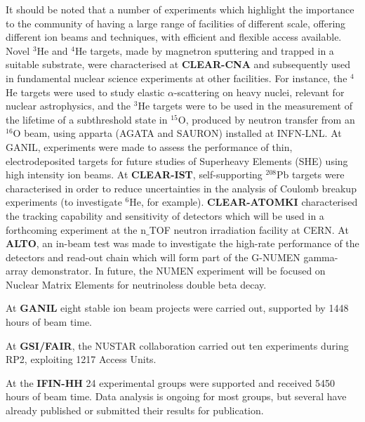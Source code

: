 It should be noted that a number of experiments which highlight the importance to the community of having a large range of facilities of different scale, offering different ion beams and techniques, with efficient and flexible access available. Novel $^3$He and $^4$He targets, made by magnetron sputtering and trapped in a suitable substrate, were characterised at \textbf{CLEAR-CNA} and subsequently used in fundamental nuclear science experiments at other facilities. For instance, the $^4$He targets were used to study elastic $\alpha$-scattering on heavy nuclei, relevant for nuclear astrophysics, and the $^3$He targets were to be used in the measurement of the lifetime of a subthreshold state in $^{15}$O, produced by neutron transfer from an $^{16}$O beam, using apparta (AGATA and SAURON) installed at INFN-LNL. 
At GANIL, experiments were made to assess the performance of thin, electrodeposited targets for future studies of Superheavy Elements (SHE) using high intensity ion beams. At \textbf{CLEAR-IST}, self-supporting $^{208}$Pb targets were characterised in order to reduce uncertainties in the analysis of Coulomb breakup experiments (to investigate $^6$He, for example). \textbf{CLEAR-ATOMKI}  characterised the tracking capability and sensitivity of detectors which will be used in a forthcoming experiment at the n$\_$TOF neutron irradiation facility at CERN. At \textbf{ALTO}, an in-beam test was made to investigate the high-rate performance of the detectors and read-out chain which will form part of the G-NUMEN gamma-array demonstrator. In future, the NUMEN experiment will be focused on Nuclear Matrix Elements for neutrinoless double beta decay. 

At \textbf{GANIL} eight stable ion beam projects were carried out, supported by 1448 hours of beam time. 

At \textbf{GSI/FAIR}, the NUSTAR collaboration carried out ten experiments during RP2, exploiting 1217 Access Units.  

At the \textbf{IFIN-HH} 24 experimental groups were supported and received 5450 hours of beam time. Data analysis is ongoing for most groups, but several have already published or submitted their results for publication. 

